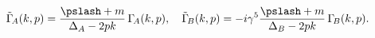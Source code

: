 \begin{equation*}
  \tilde{\Gamma}_{\!A}(k,p)=
   \frac{\pslash+m}{\Delta_A-2pk}\,\Gamma_{\!A}(k,p),\quad
  \tilde{\Gamma}_{\!B}(k,p)=
    -i\gamma^5\frac{\pslash+m}{\Delta_B-2pk}\,\Gamma_{\!B}(k,p).
\end{equation*}

